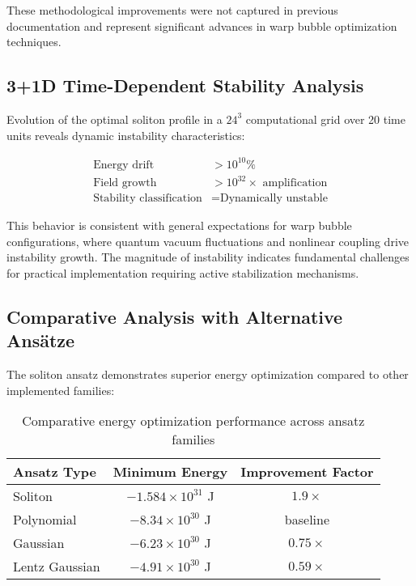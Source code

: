 \documentclass[12pt,a4paper]{article}
\begin{document}
These methodological improvements were not captured in previous documentation and represent significant advances in warp bubble optimization techniques.

\subsection{3+1D Time-Dependent Stability Analysis}

Evolution of the optimal soliton profile in a $24^3$ computational grid over 20 time units reveals dynamic instability characteristics:

\begin{align}
\text{Energy drift} &> 10^{10}\% \\
\text{Field growth} &> 10^{32} \times \text{ amplification} \\
\text{Stability classification} &= \text{Dynamically unstable}
\end{align}

This behavior is consistent with general expectations for warp bubble configurations, where quantum vacuum fluctuations and nonlinear coupling drive instability growth. The magnitude of instability indicates fundamental challenges for practical implementation requiring active stabilization mechanisms.

\subsection{Comparative Analysis with Alternative Ansätze}

The soliton ansatz demonstrates superior energy optimization compared to other implemented families:

\begin{table}[h]
\centering
\begin{tabular}{@{}lcc@{}}
\toprule
Ansatz Type & Minimum Energy & Improvement Factor \\
\midrule
Soliton & $-1.584 \times 10^{31}$ J & $1.9 \times$ \\
Polynomial & $-8.34 \times 10^{30}$ J & baseline \\
Gaussian & $-6.23 \times 10^{30}$ J & $0.75 \times$ \\
Lentz Gaussian & $-4.91 \times 10^{30}$ J & $0.59 \times$ \\
\bottomrule
\end{tabular}
\caption{Comparative energy optimization performance across ansatz families}
\end{table}
\end{document}
